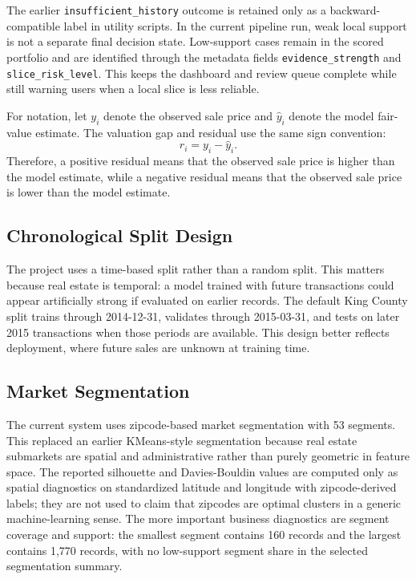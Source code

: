 \documentclass[12pt,a4paper]{article}
\begin{document}
The earlier \texttt{insufficient\_history} outcome is retained only as a backward-compatible label in utility scripts. In the current pipeline run, weak local support is not a separate final decision state. Low-support cases remain in the scored portfolio and are identified through the metadata fields \texttt{evidence\_strength} and \texttt{slice\_risk\_level}. This keeps the dashboard and review queue complete while still warning users when a local slice is less reliable.

For notation, let $y_i$ denote the observed sale price and $\hat{y}_i$ denote the model fair-value estimate. The valuation gap and residual use the same sign convention:
\[
    r_i = y_i - \hat{y}_i.
\]
Therefore, a positive residual means that the observed sale price is higher than the model estimate, while a negative residual means that the observed sale price is lower than the model estimate.

\subsection{Chronological Split Design}
The project uses a time-based split rather than a random split. This matters because real estate is temporal: a model trained with future transactions could appear artificially strong if evaluated on earlier records. The default King County split trains through 2014-12-31, validates through 2015-03-31, and tests on later 2015 transactions when those periods are available. This design better reflects deployment, where future sales are unknown at training time.

\subsection{Market Segmentation}
The current system uses zipcode-based market segmentation with 53 segments. This replaced an earlier KMeans-style segmentation because real estate submarkets are spatial and administrative rather than purely geometric in feature space. The reported silhouette and Davies-Bouldin values are computed only as spatial diagnostics on standardized latitude and longitude with zipcode-derived labels; they are not used to claim that zipcodes are optimal clusters in a generic machine-learning sense. The more important business diagnostics are segment coverage and support: the smallest segment contains 160 records and the largest contains 1,770 records, with no low-support segment share in the selected segmentation summary.
\end{document}
